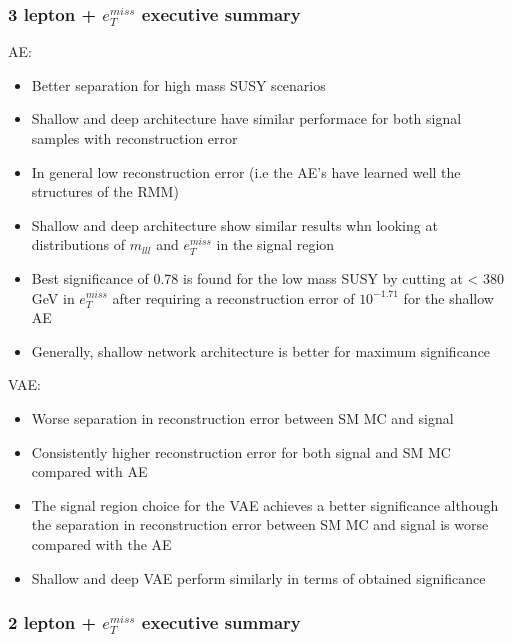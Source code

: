 \subsubsection*{3 lepton + $e_T^{miss}$ executive summary}
AE:
\begin{itemize}
    \item Better separation for high mass SUSY scenarios 
    \item Shallow and deep architecture have similar performace for both signal samples with reconstruction error
    \item In general low reconstruction error (i.e the AE's have learned well the structures of the RMM)
    \item Shallow and deep architecture show similar results whn looking at distributions of $m_{lll}$ and $e_T^{miss}$ in the signal region 
    \item Best significance of 0.78 is found for the low mass SUSY by cutting at < 380 GeV in $e_T^{miss}$ after requiring a reconstruction error of $10^{-1.71}$ for the shallow AE
    \item Generally, shallow network architecture is better for maximum significance
\end{itemize}
VAE:
\begin{itemize}
    \item Worse separation in reconstruction error between SM MC and signal
    \item Consistently higher reconstruction error for both signal and SM MC compared with AE 
    \item The signal region choice for the VAE achieves a better significance although the separation in reconstruction error between SM MC and signal is worse compared with the AE
    \item Shallow and deep VAE perform similarly in terms of obtained significance
\end{itemize}

\subsubsection*{2 lepton + $e_T^{miss}$ executive summary}

